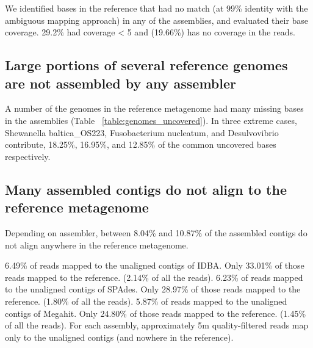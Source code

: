 \documentclass[10pt,a4paper,twocolumn]{article}
\begin{document}
We identified bases in the reference that had no match (at 99\% identity with the ambiguous mapping approach) in any of the assemblies, and evaluated their base coverage. 29.2\% had coverage < 5 and  (19.66\%) has no coverage in the reads. %



\subsection*{Large portions of several reference genomes are not assembled by any assembler}

A number of the genomes in the reference metagenome had many missing bases in the assemblies (Table ~\ref{table:genomes_uncovered}). In three extreme cases, Shewanella baltica\_OS223, Fusobacterium nucleatum, and Desulvovibrio contribute, 18.25\%, 16.95\%, and 12.85\% of the common uncovered bases respectively. %

\subsection*{Many assembled contigs do not align to the reference metagenome}
Depending on assembler, between 8.04\% and 10.87\% of the assembled contigs do not align anywhere in the reference metagenome. 

6.49\% of reads mapped to the unaligned contigs of IDBA. Only 33.01\% of those reads mapped to the reference. (2.14\% of all the reads).
6.23\% of reads mapped to the unaligned contigs of SPAdes. Only 28.97\% of those reads mapped to the reference. (1.80\% of all the reads).
5.87\% of reads mapped to the unaligned contigs of Megahit. Only 24.80\%  of those reads mapped to the reference. (1.45\% of all the reads).%
For each assembly, approximately 5m quality-filtered reads map only to the unaligned contigs (and nowhere in the reference).
\end{document}
